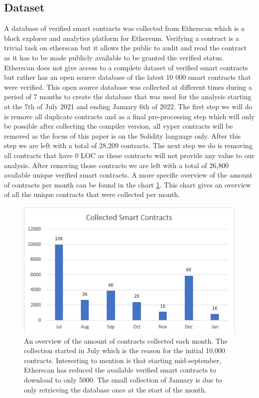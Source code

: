 \documentclass[10pt,conference]{IEEEtran}
\begin{document}
\subsection{Dataset}
A database of verified smart contracts was collected from Etherscan which is a block explorer and analytics platform for Ethereum. Verifying a contract is a trivial task on etherscan but it allows the public to audit and read the contract as it has to be made publicly available to be granted the verified status. Etherscan does not give access to a complete dataset of verified smart contracts but rather has an open source database of the latest 10 000 smart contracts that were verified. This open source database was collected at different times during a period of 7 months to create the database that was used for the analysis starting at the 7th of July 2021 and ending January 6th of 2022. The first step we will do is remove all duplicate contracts and as a final pre-processing step which will only be possible after collecting the compiler version, all vyper contracts will be removed as the focus of this paper is on the Solidity language only. After this step we are left with a total of 28,209 contracts. The next step we do is removing all contracts that have 0 LOC as these contracts will not provide any value to our analysis. After removing those contracts we are left with a total of 26,800 available unique verified smart contracts.
A more specific overview of the amount of contracts per month can be found in the chart \ref{fig:database}. This chart gives an overview of all the unique contracts that were collected per month.
\begin{figure}[h]
  \centering
  \includegraphics[width=\linewidth]{img/collected_contracts.PNG}
  \caption{An overview of the amount of contracts collected each month. The collection started in July which is the reason for the initial 10,000 contracts. Interesting to mention is that starting mid-september, Etherscan has reduced the available verified smart contracts to download to only 5000. The small collection of January is due to only retrieving the database once at the start of the month.}
  \label{fig:database}
\end{figure}
\end{document}
